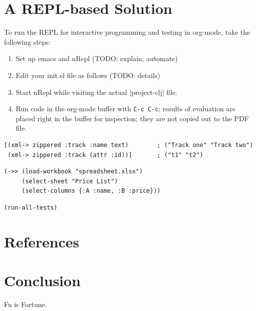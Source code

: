 \documentclass[11pt]{article}
\begin{document}
\section{A REPL-based Solution}
\label{sec-3}
\label{sec:emacs-repl}
To run the REPL for interactive programming and testing in org-mode,
take the following steps:
\begin{enumerate}
\item Set up emacs and nRepl (TODO: explain; automate)
\item Edit your init.el file as follows (TODO: details)
\item Start nRepl while visiting the actual |project-clj| file.
\item Run code in the org-mode buffer with \verb|C-c C-c|; results of
evaluation are placed right in the buffer for inspection; they are
not copied out to the PDF file.
\end{enumerate}

\begin{verbatim}
[(xml-> zippered :track :name text)        ; ("Track one" "Track two")
 (xml-> zippered :track (attr :id))]       ; ("t1" "t2")
\end{verbatim}

\begin{verbatim}
(->> (load-workbook "spreadsheet.xlsx")
     (select-sheet "Price List")
     (select-columns {:A :name, :B :price}))
\end{verbatim}

\begin{verbatim}
(run-all-tests)
\end{verbatim}
\section{References}
\label{sec-4}

\section{Conclusion}
\label{sec-5}
Fu is Fortune.
\end{document}
